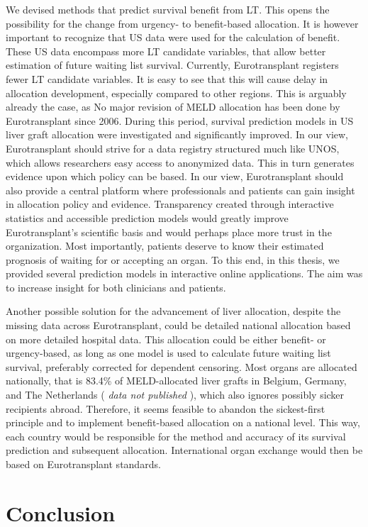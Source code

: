 \documentclass[11pt,english,]{book} %
\begin{document}
We devised methods that predict survival benefit from LT. This opens the possibility for the change from urgency- to benefit-based allocation. It is however important to recognize that US data were used for the calculation of benefit. These US data encompass more LT candidate variables, that allow better estimation of future waiting list survival. Currently, Eurotransplant registers fewer LT candidate variables. It is easy to see that this will cause delay in allocation development, especially compared to other regions. This is arguably already the case, as No major revision of MELD allocation has been done by Eurotransplant since 2006. During this period, survival prediction models in US liver graft allocation were investigated and significantly improved. In our view, Eurotransplant should strive for a data registry structured much like UNOS, which allows researchers easy access to anonymized data. This in turn generates evidence upon which policy can be based. In our view, Eurotransplant should also provide a central platform where professionals and patients can gain insight in allocation policy and evidence. Transparency created through interactive statistics and accessible prediction models would greatly improve Eurotransplant's scientific basis and would perhaps place more trust in the organization. Most importantly, patients deserve to know their estimated prognosis of waiting for or accepting an organ. To this end, in this thesis, we provided several prediction models in interactive online applications. The aim was to increase insight for both clinicians and patients.

Another possible solution for the advancement of liver allocation, despite the missing data across Eurotransplant, could be detailed national allocation based on more detailed hospital data. This allocation could be either benefit- or urgency-based, as long as one model is used to calculate future waiting list survival, preferably corrected for dependent censoring. Most organs are allocated nationally, that is 83.4\% of MELD-allocated liver grafts in Belgium, Germany, and The Netherlands ( \emph{data not published} ), which also ignores possibly sicker recipients abroad. Therefore, it seems feasible to abandon the sickest-first principle and to implement benefit-based allocation on a national level. This way, each country would be responsible for the method and accuracy of its survival prediction and subsequent allocation. International organ exchange would then be based on Eurotransplant standards.

\hypertarget{conclusion-5}{%
\section*{Conclusion}\label{conclusion-5}}
\end{document}
